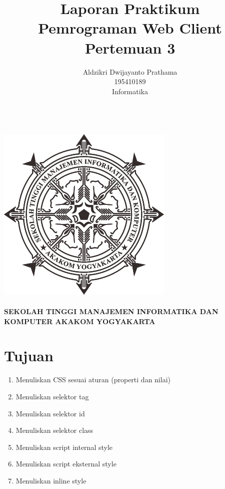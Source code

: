 \documentclass[a4paper,12pt]{article}
\begin{document}
\title{ {\Large Laporan Praktikum}\\ Pemrograman Web Client\\{\Large Pertemuan 3}}

\author{Aldzikri Dwijayanto Prathama 
	\\195410189
	\\Informatika}
\makeatletter
\begin{titlepage}
	\begin{center}
		{\huge \bfseries \@title }\\[14ex]
		\includegraphics[scale=.8]{logo}\\[4ex]
		{\large \@author}\\[12ex]
		{\large \bfseries {SEKOLAH TINGGI MANAJEMEN INFORMATIKA DAN KOMPUTER
				AKAKOM YOGYAKARTA}}
	\end{center}


\end{titlepage}
\makeatother
\newpage
\tableofcontents
\newpage
\section{Tujuan}
\begin{enumerate}
    \item Menuliskan CSS sesuai aturan (properti dan nilai)
    \item Menuliskan selektor tag
    \item Menuliskan selektor id
    \item Menuliskan selektor class
    \item Menuliskan script internal style
    \item Menuliskan script eksternal style
    \item Menuliskan inline style
\end{enumerate}
\end{document}
